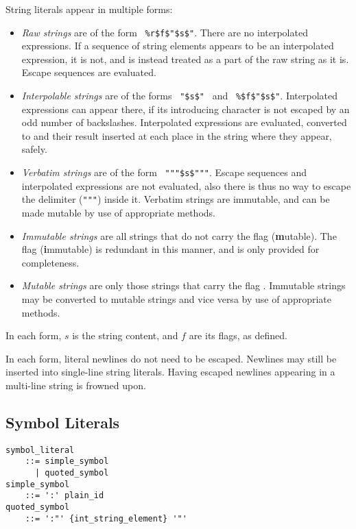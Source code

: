 String literals appear in multiple forms:
\begin{itemize}
  \item {\em Raw strings} are of the form ~\lstinline!%r$f$"$s$"!. There are no interpolated expressions. If a sequence of string elements appears to be an interpolated expression, it is not, and is instead treated as a part of the raw string as it is. Escape sequences are evaluated. 
  \item {\em Interpolable strings} are of the forms ~\lstinline!"$s$"!~ and ~\lstinline!%$f$"$s$"!. Interpolated expressions can appear there, if its introducing character is not escaped by an odd number of backslashes. Interpolated expressions are evaluated, converted to  and their result inserted at each place in the string where they appear, safely. 
  \item {\em Verbatim strings} are of the form ~\lstinline!"""$s$"""!. Escape sequences and interpolated expressions are not evaluated, also there is thus no way to escape the delimiter (\lstinline!"""!) inside it. Verbatim strings are immutable, and can be made mutable by use of appropriate methods. 
  \item {\em Immutable strings} are all strings that do not carry the flag  (\textbf{m}utable). The flag  (\textbf{i}mmutable) is redundant in this manner, and is only provided for completeness. 
  \item {\em Mutable strings} are only those strings that carry the flag . Immutable strings may be converted to mutable strings and vice versa by use of appropriate methods. 
\end{itemize}

In each form, $s$ is the string content, and $f$ are its flags, as defined. 

In each form, literal newlines do not need to be escaped. Newlines may still be inserted into single-line string literals. Having escaped newlines appearing in a multi-line string is frowned upon. 





\subsection{Symbol Literals}
\label{sec:symbolliterals}

\syntax\begin{lstlisting}
symbol_literal
    ::= simple_symbol 
      | quoted_symbol
simple_symbol 
    ::= ':' plain_id
quoted_symbol 
    ::= ':"' {int_string_element} '"'
\end{lstlisting}

